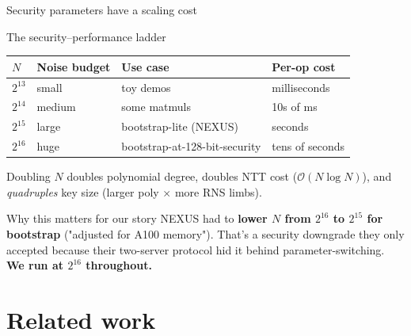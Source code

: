 \documentclass[aspectratio=169]{beamer}
\begin{document}
\begin{frame}{Security parameters have a scaling cost}
  \begin{block}{The security--performance ladder}
    \footnotesize
    \begin{tabular}{@{}llll@{}}
      \toprule
      $N$ & Noise budget & Use case & Per-op cost \\
      \midrule
      $2^{13}$ & small & toy demos     & milliseconds \\
      $2^{14}$ & medium & some matmuls  & 10s of ms \\
      $2^{15}$ & large  & bootstrap-lite (NEXUS) & seconds \\
      $2^{16}$ & huge   & \alert{bootstrap-at-128-bit-security} & \alert{tens of seconds} \\
      \bottomrule
    \end{tabular}
  \end{block}
  \vspace{0.4em}
  Doubling $N$ doubles polynomial degree, doubles NTT cost ($\mathcal{O}(N \log N)$),
  and \emph{quadruples} key size (larger poly $\times$ more RNS limbs).
  \vspace{0.6em}
  \begin{alertblock}{Why this matters for our story}
    \footnotesize
    NEXUS had to \textbf{lower $N$ from $2^{16}$ to $2^{15}$ for bootstrap}
    ("adjusted for A100 memory"). That's a security downgrade they only accepted
    because their two-server protocol hid it behind parameter-switching.
    \textbf{We run at $2^{16}$ throughout.}
  \end{alertblock}
\end{frame}

\section{Related work}
\end{document}
